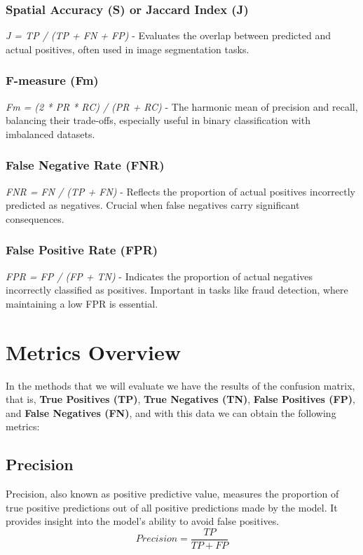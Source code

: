 \documentclass{llncs}
\begin{document}
\subsubsection{Spatial Accuracy (S) or Jaccard Index (J)}
\textit{J = TP / (TP + FN + FP)} - Evaluates the overlap between predicted and actual positives, often used in image segmentation tasks.

\subsubsection{F-measure (Fm)}
\textit{Fm = (2 * PR * RC) / (PR + RC)} - The harmonic mean of precision and recall, balancing their trade-offs, especially useful in binary classification with imbalanced datasets.

\subsubsection{False Negative Rate (FNR)}
\textit{FNR = FN / (TP + FN)} - Reflects the proportion of actual positives incorrectly predicted as negatives. Crucial when false negatives carry significant consequences.

\subsubsection{False Positive Rate (FPR)}
\textit{FPR = FP / (FP + TN)} - Indicates the proportion of actual negatives incorrectly classified as positives. Important in tasks like fraud detection, where maintaining a low FPR is essential.



\section{Metrics Overview}

In the methods that we will evaluate we have the results of the confusion matrix, that is, \textbf{True Positives (TP)}, \textbf{True Negatives (TN)}, \textbf{False Positives (FP)}, and \textbf{False Negatives (FN)}, and with this data we can obtain the following metrics:

\subsection{Precision}
Precision, also known as positive predictive value, measures the proportion of true positive predictions out of all positive predictions made by the model. It provides insight into the model’s ability to avoid false positives.
\[
Precision = \frac{TP}{TP + FP}
\]
\end{document}
